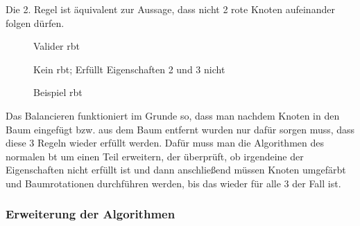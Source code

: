 \documentclass[11pt]{article}
\begin{document}
Die 2. Regel ist äquivalent zur Aussage, dass nicht 2 rote Knoten aufeinander folgen dürfen. \cite[S. 220f]{aic} 

\begin{figure}[h]
\begin{minipage}[t]{.45\linewidth}
  \centering
  \caption{Valider \gls{rbt}}
  \end{minipage}
  \hfill
  \begin{minipage}[t]{.45\linewidth}
  \centering
  \caption{Kein \gls{rbt}; Erfüllt Eigenschaften 2 und 3 nicht}
  \end{minipage}
  
  \caption{Beispiel \gls{rbt}}
\end{figure}
  

Das Balancieren funktioniert im Grunde so, dass man nachdem Knoten in den Baum eingefügt 
bzw. aus dem Baum entfernt wurden nur dafür sorgen muss, dass diese 3 Regeln wieder erfüllt werden. 
Dafür muss man die Algorithmen des normalen \gls{bt} um einen Teil erweitern, der überprüft, 
ob irgendeine der Eigenschaften nicht erfüllt ist und dann anschließend müssen Knoten umgefärbt und Baumrotationen durchführen werden, bis das wieder für alle 3 der Fall ist. 

\subsubsection{Erweiterung der Algorithmen}
\end{document}
